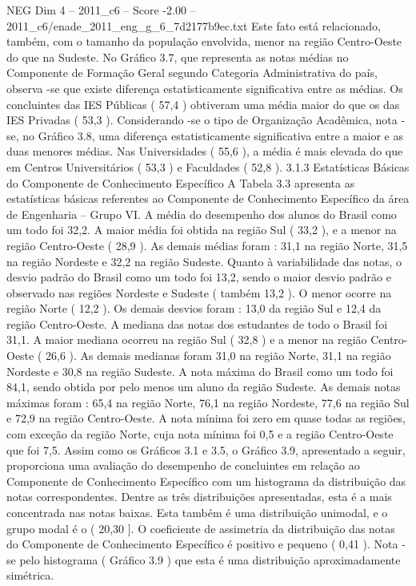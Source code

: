 \begin{textsample}{NEG Dim 4 – 2011\_c6 – Score -2.00 – 2011\_c6/enade\_2011\_eng\_g\_6\_7d2177b9ec.txt}
Este fato está relacionado, também, com o tamanho da população envolvida, menor na região Centro-Oeste do que na Sudeste.
No Gráfico 3.7, que representa as notas médias no Componente de Formação Geral segundo Categoria Administrativa do país, observa -se que existe diferença estatisticamente significativa entre as médias.
Os concluintes das IES Públicas ( 57,4 ) obtiveram uma média maior do que os das IES Privadas ( 53,3 ).
Considerando -se o tipo de Organização Acadêmica, nota -se, no Gráfico 3.8, uma diferença estatisticamente significativa entre a maior e as duas menores médias.
Nas Universidades ( 55,6 ), a média é mais elevada do que em Centros Universitários ( 53,3 ) e Faculdades ( 52,8 ). 3.1.3 Estatísticas Básicas do Componente de Conhecimento Específico A Tabela 3.3 apresenta as estatísticas básicas referentes ao Componente de Conhecimento Específico da área de Engenharia – Grupo VI.
A média do desempenho dos alunos do Brasil como um todo foi 32,2.
A maior média foi obtida na região Sul ( 33,2 ), e a menor na região Centro-Oeste ( 28,9 ).
As demais médias foram : 31,1 na região Norte, 31,5 na região Nordeste e 32,2 na região Sudeste.
Quanto à variabilidade das notas, o desvio padrão do Brasil como um todo foi 13,2, sendo o maior desvio padrão e observado nas regiões Nordeste e Sudeste ( também 13,2 ).
O menor ocorre na região Norte ( 12,2 ).
Os demais desvios foram : 13,0 da região Sul e 12,4 da região Centro-Oeste.
A mediana das notas dos estudantes de todo o Brasil foi 31,1.
A maior mediana ocorreu na região Sul ( 32,8 ) e a menor na região Centro-Oeste ( 26,6 ).
As demais medianas foram 31,0 na região Norte, 31,1 na região Nordeste e 30,8 na região Sudeste.
A nota máxima do Brasil como um todo foi 84,1, sendo obtida por pelo menos um aluno da região Sudeste.
As demais notas máximas foram : 65,4 na região Norte, 76,1 na região Nordeste, 77,6 na região Sul e 72,9 na região Centro-Oeste.
A nota mínima foi zero em quase todas as regiões, com exceção da região Norte, cuja nota mínima foi 0,5 e a região Centro-Oeste que foi 7,5.
Assim como os Gráficos 3.1 e 3.5, o Gráfico 3.9, apresentado a seguir, proporciona uma avaliação do desempenho de concluintes em relação ao Componente de Conhecimento Específico com um histograma da distribuição das notas correspondentes.
Dentre as três distribuições apresentadas, esta é a mais concentrada nas notas baixas.
Esta também é uma distribuição unimodal, e o grupo modal é o ( 20,30 ].
O coeficiente de assimetria da distribuição das notas do Componente de Conhecimento Específico é positivo e pequeno ( 0,41 ).
Nota -se pelo histograma ( Gráfico 3.9 ) que esta é uma distribuição aproximadamente simétrica.

\end{textsample}
